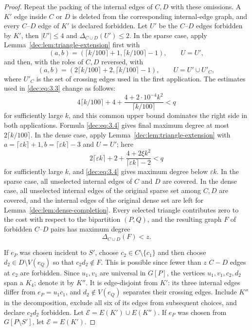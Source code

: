 \documentclass[11pt]{article}
\numberwithin{equation}{section}
\theoremstyle{remark}
\newcommand{\e}{\varepsilon}
\begin{document}
\begin{proof}
Repeat the packing of the internal edges of \(C,D\) with these omissions.
A \(K'\) edge inside \(C\) or \(D\) is deleted from the corresponding
internal-edge graph, and every \(C\)--\(D\) edge of \(K'\) is declared forbidden.
Let \(U'\) be the \(C\)--\(D\) edges forbidden by \(K'\), then
\(|U'|\le4\) and \(\Delta_{C\cup D}(U')\le2\).  In the sparse case, apply
Lemma~\ref{dec:lem:triangle-extension} first with
\begin{equation*}
 (a,b)=(\lceil k/100\rceil+1,\lceil k/100\rceil-1),\qquad U=U',
\end{equation*}
and then, with the roles of \(C,D\) reversed, with
\begin{equation*}
 (a,b)=(2\lceil k/100\rceil+2,\lceil k/100\rceil-1),\qquad U=U'\cup U'_C,
\end{equation*}
where \(U'_C\) is the set of crossing edges used in the first application.
The estimates used in \eqref{dec:eq:3.3} change as follows:
\begin{equation*}
 4\lceil k/100\rceil+4+\frac{4+2\cdot10^{-4}k^2}{\lceil k/100\rceil}<q
\end{equation*}
for sufficiently large \(k\), and this common upper bound dominates the right side in
both applications.  Formula \eqref{dec:eq:3.4} gives final maximum degree at most
\(2\lceil k/100\rceil\).
In the dense case, apply Lemma~\ref{dec:lem:triangle-extension} with \(a=\lceil\e k\rceil+1, b=\lceil\e k\rceil-3\) and \(U=U'\); here
\begin{equation*}
 2\lceil\e k\rceil+2+
 \frac{4+2\xi k^2}{\lceil\e k\rceil-2}
 <q
\end{equation*}
for sufficiently large \(k\), and \eqref{dec:eq:3.4} gives maximum degree below \(\e k\).
In the sparse case, all unselected internal edges of \(C\) and \(D\) are covered.
In the dense case, all unselected internal edges of the original sparse set
among \(C,D\) are covered, and the internal edges of the original dense set
are left for Lemma~\ref{dec:lem:dense-completion}.  Every selected triangle
contributes zero to the cost with respect to the bipartition \((P,Q)\), and
the resulting graph \(F\) of forbidden \(C\)--\(D\) pairs has maximum degree
\begin{equation}\label{dec:eq:4.4}
 \Delta_{C\cup D}(F)<z.
\end{equation}

If \(e_P\) was chosen incident to \(S'\), choose \(c_2\in C\setminus\{c_1\}\) and
then choose \(d_2\in D\setminus V(e_Q)\) so that \(c_2d_2\notin F\).
This is possible since fewer than \(z\) \(C-D\) edges at \(c_2\) are forbidden.
Since \(u_1,v_1\) are universal in \(G[P]\), the vertices
\(u_1,v_1,c_2,d_2\) span a \(K_4\); denote it by \(K''\).  It is edge-disjoint
from \(K'\): its three internal edges differ from \(e_P=u_1c_1\), and
\(d_2\notin V(e_Q)\) separates their crossing edges.  Include \(K''\) in
the decomposition, exclude all six of its edges from subsequent choices,
and declare \(c_2d_2\) forbidden. Let \(\mathcal E=E(K')\cup E(K'')\).
If \(e_P\) was chosen from \(G[P\setminus S']\), let \(\mathcal E=E(K')\).


\end{proof}
\end{document}
